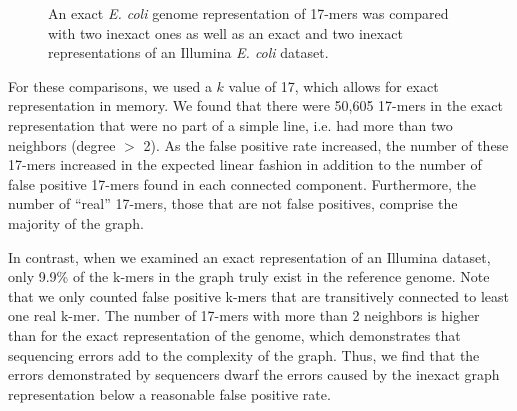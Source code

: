 \documentclass[12pt]{article} \usepackage{simplemargins}
\begin{document}
\begin{figure}
\caption{An exact \emph{E. coli} genome representation of 17-mers was compared with 
two inexact ones as well as an exact and two inexact representations of an Illumina 
\emph{E. coli} dataset.}
\end{figure}

For these comparisons, we used a $k$ value of 17, which allows for exact
representation in memory. We found 
that there were 50,605 17-mers in the exact representation that were no
part of a simple line, i.e. had more 
than two neighbors (degree $>$ 2). As the false positive rate 
increased, the number of these 
17-mers increased in the expected linear fashion in addition to the number of 
false positive 17-mers found in each connected component. Furthermore, the number of 
``real'' 17-mers, those that are not false positives, 
comprise the majority of the graph.

In contrast, when we examined an exact representation of an Illumina
dataset, only 9.9\% of the k-mers in the graph truly exist in the
reference genome. Note that we only counted false positive k-mers that
are transitively connected to least one real k-mer. The
number of 17-mers with more than 2 neighbors is higher
than for the exact representation of the genome, which demonstrates
that sequencing errors add to the complexity of the
graph. Thus, we find that the errors demonstrated by sequencers dwarf
the errors caused by the inexact graph representation below a
reasonable false positive rate.
\end{document}
